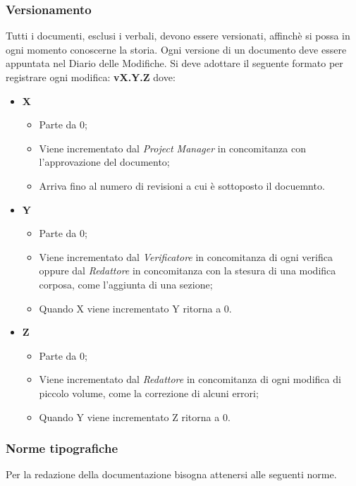 	\subsubsection{Versionamento}
	\label{versionamento}
	Tutti i documenti, esclusi i verbali, devono essere versionati, affinchè si possa in ogni momento conoscerne la storia. Ogni versione di un documento deve essere appuntata nel Diario delle Modifiche. Si deve adottare il seguente formato per registrare ogni modifica: 
	\textbf{v{X}.{Y}.{Z}}
	dove:
	\begin{itemize}
		\item \textbf{X}
		\begin{itemize}
			\item Parte da 0;
			\item Viene incrementato dal \textit{Project Manager} in concomitanza con l'approvazione del documento;
			\item Arriva fino al numero di revisioni a cui è sottoposto il docuemnto.
		\end{itemize}
		
		\item \textbf{Y}
		\begin{itemize}
			\item Parte da 0;
			\item Viene incrementato dal \emph{Verificatore} in concomitanza di ogni verifica oppure dal \emph{Redattore} in concomitanza con la stesura di una modifica corposa, come l'aggiunta di una sezione;
			\item Quando X viene incrementato Y ritorna a 0.
		\end{itemize}
		
		\item \textbf{Z}
		\begin{itemize}
			\item Parte da 0;
			\item Viene incrementato dal \textit{Redattore} in concomitanza di ogni modifica di piccolo volume, come la correzione di alcuni errori;
			\item Quando Y viene incrementato Z	 ritorna a 0.
		\end{itemize}
		
	\end{itemize}
	
	\subsubsection{Norme tipografiche} 
	Per la redazione della documentazione bisogna attenersi alle seguenti norme.
		
